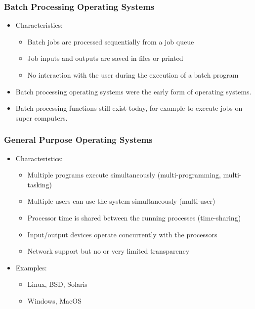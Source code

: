\documentclass[11pt]{article}
\begin{document}
\subsubsection{Batch Processing Operating Systems}
\label{sec:org5b391ae}
\begin{itemize}
\item Characteristics:
\begin{itemize}
\item Batch jobs are processed sequentially from a job queue
\item Job inputs and outputs are saved in files or printed
\item No interaction with the user during the execution of a batch program
\end{itemize}
\item Batch processing operating systems were the early form of operating systems.
\item Batch processing functions still exist today, for example to execute jobs on super computers.
\end{itemize}
\subsubsection{General Purpose Operating Systems}
\label{sec:org32b8cd9}
\begin{itemize}
\item Characteristics:
\begin{itemize}
\item Multiple programs execute simultaneously (multi-programming, multi-tasking)
\item Multiple users can use the system simultaneously (multi-user)
\item Processor time is shared between the running processes (time-sharing)
\item Input/output devices operate concurrently with the processors
\item Network support but no or very limited transparency
\end{itemize}
\item Examples:
\begin{itemize}
\item Linux, BSD, Solaris
\item Windows, MacOS
\end{itemize}
\end{itemize}
\end{document}
